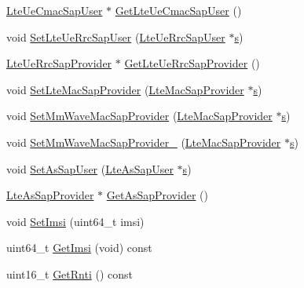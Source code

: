 \begin{DoxyCompactItemize}
\item 
\hyperlink{classns3_1_1LteUeCmacSapUser}{Lte\+Ue\+Cmac\+Sap\+User} $\ast$ \hyperlink{classns3_1_1LteUeRrc_a1c2e94246e985b0c9ec163e42af517a4}{Get\+Lte\+Ue\+Cmac\+Sap\+User} ()
\item 
void \hyperlink{classns3_1_1LteUeRrc_ae34045b73befe932bc6d55e4f78b54d8}{Set\+Lte\+Ue\+Rrc\+Sap\+User} (\hyperlink{classns3_1_1LteUeRrcSapUser}{Lte\+Ue\+Rrc\+Sap\+User} $\ast$\hyperlink{generate__test__data__lte__sinr_8m_ad83eeb3a142285d1243a08c6b7026df8}{s})
\item 
\hyperlink{classns3_1_1LteUeRrcSapProvider}{Lte\+Ue\+Rrc\+Sap\+Provider} $\ast$ \hyperlink{classns3_1_1LteUeRrc_aa68bed247c32eb09f5cb98ea79a29df0}{Get\+Lte\+Ue\+Rrc\+Sap\+Provider} ()
\item 
void \hyperlink{classns3_1_1LteUeRrc_a6316077df9aa91c0bfaedee4052dc9b8}{Set\+Lte\+Mac\+Sap\+Provider} (\hyperlink{classns3_1_1LteMacSapProvider}{Lte\+Mac\+Sap\+Provider} $\ast$\hyperlink{generate__test__data__lte__sinr_8m_ad83eeb3a142285d1243a08c6b7026df8}{s})
\item 
void \hyperlink{classns3_1_1LteUeRrc_a4b070e0939fbf52c3e567be692d0a5d1}{Set\+Mm\+Wave\+Mac\+Sap\+Provider} (\hyperlink{classns3_1_1LteMacSapProvider}{Lte\+Mac\+Sap\+Provider} $\ast$\hyperlink{generate__test__data__lte__sinr_8m_ad83eeb3a142285d1243a08c6b7026df8}{s})
\item 
void \hyperlink{classns3_1_1LteUeRrc_af2253dd4db3267d7e50cb8220b8f9c36}{Set\+Mm\+Wave\+Mac\+Sap\+Provider\+\_} (\hyperlink{classns3_1_1LteMacSapProvider}{Lte\+Mac\+Sap\+Provider} $\ast$\hyperlink{generate__test__data__lte__sinr_8m_ad83eeb3a142285d1243a08c6b7026df8}{s})
\item 
void \hyperlink{classns3_1_1LteUeRrc_ae17d4ad71632cd5dc17ffe28ff14d8e3}{Set\+As\+Sap\+User} (\hyperlink{classns3_1_1LteAsSapUser}{Lte\+As\+Sap\+User} $\ast$\hyperlink{generate__test__data__lte__sinr_8m_ad83eeb3a142285d1243a08c6b7026df8}{s})
\item 
\hyperlink{classns3_1_1LteAsSapProvider}{Lte\+As\+Sap\+Provider} $\ast$ \hyperlink{classns3_1_1LteUeRrc_a5fc603c369af0fb3cd330d0d3e6214dc}{Get\+As\+Sap\+Provider} ()
\item 
void \hyperlink{classns3_1_1LteUeRrc_aefe783bf879656e75be231462a4a8ee5}{Set\+Imsi} (uint64\+\_\+t imsi)
\item 
uint64\+\_\+t \hyperlink{classns3_1_1LteUeRrc_a23d7c9decffd3f490a777d025740968d}{Get\+Imsi} (void) const 
\item 
uint16\+\_\+t \hyperlink{classns3_1_1LteUeRrc_a5d7fad482ff68a116c0bab7433c816ec}{Get\+Rnti} () const 

\end{DoxyCompactItemize}

